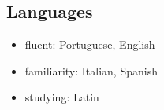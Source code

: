 \subsection*{Languages}

\begin{itemize}
    \item fluent: Portuguese, English
    \item familiarity: Italian, Spanish
    \item studying: Latin
\end{itemize}
